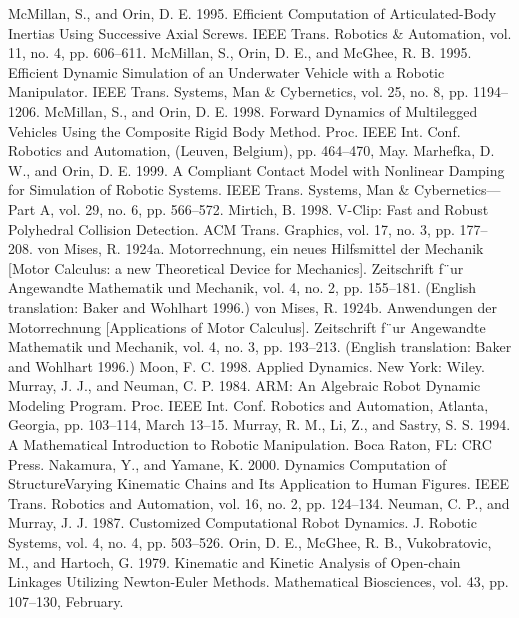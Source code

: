 McMillan, S., and Orin, D. E. 1995. Efficient Computation of Articulated-Body Inertias Using Successive Axial Screws. IEEE Trans. Robotics \& Automation, vol. 11, no. 4, pp. 606–611. McMillan, S., Orin, D. E., and McGhee, R. B. 1995. Efficient Dynamic Simulation of an Underwater Vehicle with a Robotic Manipulator. IEEE Trans. Systems, Man \& Cybernetics, vol. 25, no. 8, pp. 1194–1206. McMillan, S., and Orin, D. E. 1998. Forward Dynamics of Multilegged Vehicles Using the Composite Rigid Body Method. Proc. IEEE Int. Conf. Robotics and Automation, (Leuven, Belgium), pp. 464–470, May. Marhefka, D. W., and Orin, D. E. 1999. A Compliant Contact Model with Nonlinear Damping for Simulation of Robotic Systems. IEEE Trans. Systems, Man \& Cybernetics—Part A, vol. 29, no. 6, pp. 566–572. Mirtich, B. 1998. V-Clip: Fast and Robust Polyhedral Collision Detection. ACM Trans. Graphics, vol. 17, no. 3, pp. 177–208. von Mises, R. 1924a. Motorrechnung, ein neues Hilfsmittel der Mechanik [Motor Calculus: a new Theoretical Device for Mechanics]. Zeitschrift f¨ur Angewandte Mathematik und Mechanik, vol. 4, no. 2, pp. 155–181. (English translation: Baker and Wohlhart 1996.) von Mises, R. 1924b. Anwendungen der Motorrechnung [Applications of Motor Calculus]. Zeitschrift f¨ur Angewandte Mathematik und Mechanik, vol. 4, no. 3, pp. 193–213. (English translation: Baker and Wohlhart 1996.) Moon, F. C. 1998. Applied Dynamics. New York: Wiley. Murray, J. J., and Neuman, C. P. 1984. ARM: An Algebraic Robot Dynamic Modeling Program. Proc. IEEE Int. Conf. Robotics and Automation, Atlanta, Georgia, pp. 103–114, March 13–15. Murray, R. M., Li, Z., and Sastry, S. S. 1994. A Mathematical Introduction to Robotic Manipulation. Boca Raton, FL: CRC Press. Nakamura, Y., and Yamane, K. 2000. Dynamics Computation of StructureVarying Kinematic Chains and Its Application to Human Figures. IEEE Trans. Robotics and Automation, vol. 16, no. 2, pp. 124–134. Neuman, C. P., and Murray, J. J. 1987. Customized Computational Robot Dynamics. J. Robotic Systems, vol. 4, no. 4, pp. 503–526. Orin, D. E., McGhee, R. B., Vukobratovic, M., and Hartoch, G. 1979. Kinematic and Kinetic Analysis of Open-chain Linkages Utilizing Newton-Euler Methods. Mathematical Biosciences, vol. 43, pp. 107–130, February.

